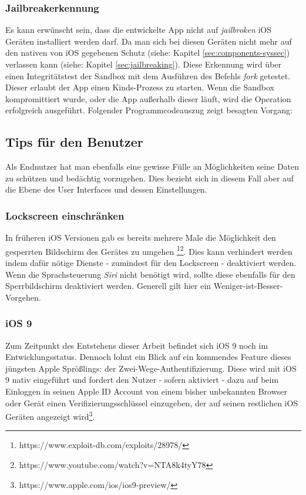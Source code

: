 		\subsubsection{Jailbreakerkennung}
			Es kann erwünscht sein, dass die entwickelte App nicht auf
			\textsl{jailbroken} iOS Geräten installiert werden darf. Da man sich bei
			diesen Geräten nicht mehr auf den nativen von iOS gegebenen Schutz (siehe:
			Kapitel \ref{sec:components-syssec}) verlassen kann (siehe: Kapitel
			\ref{sec:jailbreaking}). Diese Erkennung wird über einen
			Integritätstest der Sandbox mit dem Ausführen des Befehls \textsl{fork}
			getestet\cite[S.328]{Zdziarski2012}. Dieser erlaubt der App einen
			Kinds-Prozess zu starten. Wenn die Sandbox kompromittiert wurde, oder die App
			außerhalb dieser läuft, wird die Operation erfolgreich ausgeführt. Folgender
			Programmcodeauszug zeigt besagten Vorgang:
			
	\subsection{Tips für den Benutzer}
		Als Endnutzer hat man ebenfalls eine gewisse Fülle an Möglichkeiten seine
		Daten zu schützen und bedächtig vorzugehen. Dies bezieht sich in diesem Fall
		aber auf die Ebene des User Interfaces und dessen Einstellungen.
		\subsubsection{Lockscreen einschränken}
			In früheren iOS Versionen gab es bereits mehrere Male die Möglichkeit den
			gesperrten Bildschirm des Gerätes zu umgehen
			\footnote{https://www.exploit-db.com/exploits/28978/}\footnote{https://www.youtube.com/watch?v=NTA8k4tyY78}.
			Dies kann verhindert werden indem dafür nötige Dienste - zumindest für den Lockscreen
			- deaktiviert werden. Wenn die Sprachsteuerung \textsl{Siri} nicht benötigt
			wird, sollte diese ebenfalls für den Sperrbildschirm deaktiviert werden.
			Generell gilt hier ein Weniger-ist-Besser-Vorgehen.
		\subsubsection{iOS 9}
			Zum Zeitpunkt des Entstehens dieser Arbeit befindet sich iOS 9 noch im
			Entwicklungsstatus. Dennoch lohnt ein Blick auf ein kommendes Feature dieses
			jüngsten Apple Sprößlings: der Zwei-Wege-Authentifizierung. Diese wird mit
			iOS 9 nativ eingeführt und fordert den Nutzer - sofern aktiviert - dazu auf
			beim Einloggen in seinen Apple ID Account von einem bisher unbekannten
			Browser oder Gerät einen Verifizierungsschlüssel einzugeben, der auf seinen
			restlichen iOS Geräten angezeigt
			wird\footnote{https://www.apple.com/ios/ios9-preview/}.
